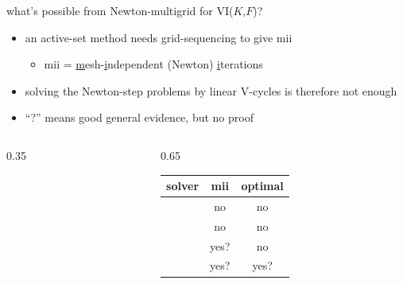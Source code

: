 \documentclass[aspectratio=169,10pt]{beamer}
\newcommand{\lc}{{\text{\large $\circ$}}}
\begin{document}
\begin{frame}{what's possible from Newton-multigrid for VI($K$,$F$)?}

\begin{itemize}
\item an active-set method \alert{needs grid-sequencing} to give \alert{mii}
    \begin{itemize}
    \item[$\lc$] \alert{mii} = \underline{m}esh-\underline{i}ndependent (Newton) \underline{i}terations
    \end{itemize}
\item solving the Newton-step problems by linear V-cycles is therefore \alert{not} enough
\item<2> ``?'' means good general evidence, but no proof
\end{itemize}

\begin{columns}
\begin{column}{0.35\textwidth}
\centering

\vspace{15mm}


\end{column}
\begin{column}{0.65\textwidth}
{\small
\begin{tabular}{lcc}
solver & \alert{mii} & optimal \\
\midrule
 & no & no \\
 & \alert{no} & no \\
\onslide<2->{
 & yes? & no \\
 & yes? & yes?
}
\end{tabular}
}
\end{column}
\end{columns}
\end{frame}
\end{document}
